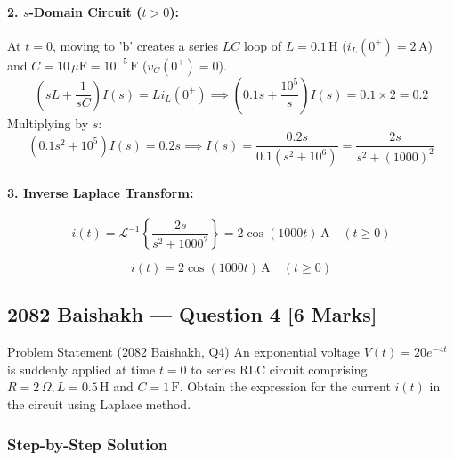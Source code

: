 \documentclass[11pt,a4paper,oneside]{article}
\begin{document}
\paragraph{2. $s$-Domain Circuit ($t > 0$):}
At $t=0$, moving to 'b' creates a series $LC$ loop of $L = 0.1\,\mathrm{H}$ ($i_L(0^+) = 2\,\mathrm{A}$) and $C = 10\,\mu\mathrm{F} = 10^{-5}\,\mathrm{F}$ ($v_C(0^+) = 0$).
\begin{equation}
  \left(sL + \frac{1}{sC}\right) I(s) = L i_L(0^+) \implies \left(0.1s + \frac{10^5}{s}\right) I(s) = 0.1 \times 2 = 0.2
\end{equation}
Multiplying by $s$:
\begin{equation}
  (0.1 s^2 + 10^5) I(s) = 0.2 s \implies I(s) = \frac{0.2 s}{0.1(s^2 + 10^6)} = \frac{2s}{s^2 + (1000)^2}
\end{equation}
\paragraph{3. Inverse Laplace Transform:}
\begin{equation}
  i(t) = \mathcal{L}^{-1}\left\{\frac{2s}{s^2 + 1000^2}\right\} = 2 \cos(1000t)\,\mathrm{A} \quad (t \ge 0)
\end{equation}

\begin{answerbox}
\[
i(t) = 2 \cos(1000t)\,\mathrm{A} \quad (t \ge 0)
\]
\end{answerbox}

\newpage

\subsection{2082 Baishakh --- Question 4 [6 Marks]}

\begin{questionbox}{Problem Statement (2082 Baishakh, Q4)}
An exponential voltage $V(t) = 20e^{-4t}$ is suddenly applied at time $t = 0$ to series RLC circuit comprising $R = 2\,\Omega, L = 0.5\,\mathrm{H}$ and $C = 1\,\mathrm{F}$. Obtain the expression for the current $i(t)$ in the circuit using Laplace method.
\end{questionbox}

\subsubsection*{Step-by-Step Solution}
\end{document}
